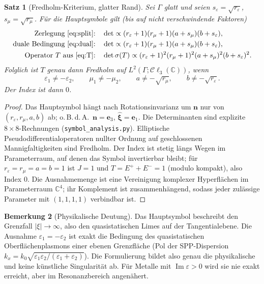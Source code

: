 \documentclass[11pt, a4paper]{article}
\newcommand{\mvec}[1]{\boldsymbol{#1}}
\newcommand{\clc}{\mathcal{C}\ell_{3}(\mathbb{C})}
\newcommand{\n}{\mvec{n}}
\theoremstyle{plain}
\newtheorem{satz}{Satz}[section]
\theoremstyle{definition}
\newtheorem{bemerkung}[satz]{Bemerkung}
\newcommand{\status}[1]{\hfill{\small\sffamily[#1]}}
\begin{document}
\begin{satz}[Fredholm-Kriterium, glatter Rand]\label{satz:symbol}\status{bewiesen, symb.\ verif.}
Sei $\Gamma$ glatt und seien $s_\varepsilon = \sqrt{r_\varepsilon}$, $s_\mu =
\sqrt{r_\mu}$. Für die Hauptsymbole gilt (bis auf nicht verschwindende Faktoren)
\begin{align*}
  \text{Zerlegung \eqref{eq:split}:}\quad & \det \propto
    (r_\varepsilon+1)(r_\mu+1)(a+s_\mu)(b+s_\varepsilon),\\
  \text{duale Bedingung \eqref{eq:dual}:}\quad & \det \propto
    (r_\varepsilon+1)(r_\mu+1)(a+s_\mu)(b+s_\varepsilon),\\
  \text{Operator $T$ aus \eqref{eq:T}:}\quad & \det\sigma(T) \propto
    (r_\varepsilon+1)^2(r_\mu+1)^2(a+s_\mu)^2(b+s_\varepsilon)^2 .
\end{align*}
Folglich ist $T$ genau dann Fredholm auf $L^2(\Gamma;\clc)$, wenn
\[
  \varepsilon_1\neq-\varepsilon_2,\qquad \mu_1\neq-\mu_2,\qquad
  a\neq-\sqrt{r_\mu},\qquad b\neq-\sqrt{r_\varepsilon}.
\]
Der Index ist dann $0$.
\end{satz}
\begin{proof}
Das Hauptsymbol hängt nach Rotationsinvarianz um $\n$ nur von
$(r_\varepsilon,r_\mu,a,b)$ ab; o.\,B.\,d.\,A.\ $\n=\mvec{e}_3$,
$\hat{\mvec{\xi}}=\mvec{e}_1$. Die Determinanten sind explizite $8\times8$-Rechnungen
(\texttt{symbol\_analysis.py}). Elliptische Pseudodifferentialoperatoren
nullter Ordnung auf geschlossenen Mannigfaltigkeiten sind Fredholm. Der Index ist
stetig längs Wegen im Parameterraum, auf denen das Symbol invertierbar bleibt;
für $r_\varepsilon=r_\mu=a=b=1$ ist $J=1$ und $T=E^++E^-=1$ (modulo kompakt),
also Index $0$. Die Ausnahmemenge ist eine Vereinigung komplexer Hyperflächen im
Parameterraum $\mathbb{C}^4$; ihr Komplement ist zusammenhängend, sodass jeder
zulässige Parameter mit $(1,1,1,1)$ verbindbar ist.
\end{proof}

\begin{bemerkung}[Physikalische Deutung]
Das Hauptsymbol beschreibt den Grenzfall $|\xi|\to\infty$, also den
quasistatischen Limes auf der Tangentialebene. Die Ausnahme
$\varepsilon_1=-\varepsilon_2$ ist exakt die Bedingung des quasistatischen
Oberflächenplasmons einer ebenen Grenzfläche (Pol der SPP-Dispersion
$k_x = k_0\sqrt{\varepsilon_1\varepsilon_2/(\varepsilon_1+\varepsilon_2)}$).
Die Formulierung bildet also genau die physikalische und keine künstliche
Singularität ab. Für Metalle mit $\operatorname{Im}\varepsilon>0$ wird sie nie
exakt erreicht, aber im Resonanzbereich angenähert.
\end{bemerkung}
\end{document}
